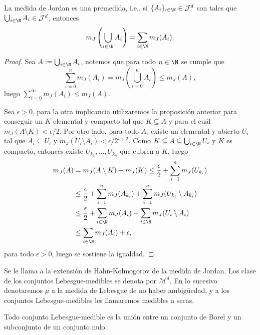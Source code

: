 \begin{thm}
	La medida de Jordan es una premedida, i.e., si $\{A_i\}_{i\in\N} \in \mathcal{J}^d$ son tales que $\bigcup_{i\in\N} A_i \in \mathcal{J}^d$, entonces
	$$ m_J\left( \bigcup_{i\in\N} A_i \right) = \sum_{i\in\N} m_J(A_i). $$
\end{thm}
\begin{proof}
	Sea $A := \bigcup_{i\in\N} A_i$, notemos que para todo $n\in\N$ se cumple que
	$$ \sum_{i=0}^n m_J(A_i) = m_J\left( \bigcup_{i=0}^n A_i \right) \le m_J(A), $$
	luego $\sum_{i=0}^\infty m_J(A_i) \le m_J(A)$.
	\par
	Sea $\epsilon > 0$, para la otra implicancia utilizaremos la proposición anterior para conseguir un $K$ elemental y compacto tal que $K \subseteq A$ y para el cuál $m_J(A \setminus K) < \epsilon/2$.
	Por otro lado, para todo $A_i$ existe un elemental y abierto $U_i$ tal que $A_i \subseteq U_i$ y $m_J(U_i \setminus A_i) < \epsilon/2^{i+2}$.
	Como $K \subseteq A \subseteq \bigcup_{i\in\N} U_i$ y $K$ es compacto, entonces existe $U_{k_1},\dots,U_{k_n}$ que cubren a $K$, luego
	\begin{align*}
		m_J(A) &= m_J(A\setminus K) + m_J(K) \le \frac{\epsilon}{2} + \sum_{i=1}^n m_J(U_{k_i})\\
		&\le \frac{\epsilon}{2} + \sum_{i=1}^n m_J(A_{k_i}) + \sum_{i=1}^n m_J(U_{k_i} \setminus A_{k_i}) \\
		&\le \frac{\epsilon}{2} + \sum_{i\in\N}m_J(A_i) + \sum_{i\in\N} m_J(U_i \setminus A_i) \\
		&\le \sum_{i\in\N}m_J(A_i) + \epsilon,
	\end{align*}
	para todo $\epsilon > 0$, luego se sostiene la igualdad.
\end{proof}
\thmdep{}

\begin{mydefi}
	Se le llama  a la extensión de Hahn-Kolmogorov de la medida de Jordan.
	Los clase de los conjuntos Lebesgue-medibles se denota por $\mathcal{M}^d$.
	En lo sucesivo denotaremos $\mu$ a la medida de Lebesgue de no haber ambigüedad, y a los conjuntos Lebesgue-medibles les llamaremos medibles a secas.
\end{mydefi}

\begin{cor}
	Todo conjunto Lebesgue-medible es la unión entre un conjunto de Borel y un subconjunto de un conjunto nulo.
\end{cor}

